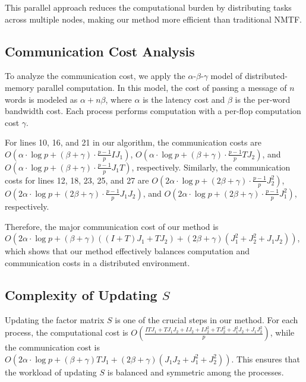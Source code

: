 \documentclass[journal]{IEEEtran}
\begin{document}
This parallel approach reduces the computational burden by distributing tasks across multiple nodes, making our method more efficient than traditional NMTF.

\subsection{Communication Cost Analysis}

To analyze the communication cost, we apply the $\alpha$-$\beta$-$\gamma$ model of distributed-memory parallel computation. In this model, the cost of passing a message of $n$ words is modeled as $\alpha + n\beta$, where $\alpha$ is the latency cost and $\beta$ is the per-word bandwidth cost. Each process performs computation with a per-flop computation cost $\gamma$.


For lines 10, 16, and 21 in our algorithm, the communication costs are $O\left(\alpha \cdot \log p + (\beta + \gamma) \cdot \frac{p-1}{p} IJ_1\right)$, $O\left(\alpha \cdot \log p + (\beta + \gamma) \cdot \frac{p-1}{p} TJ_2\right)$, and $O\left(\alpha \cdot \log p + (\beta + \gamma) \cdot \frac{p-1}{p} J_1T\right)$, respectively. Similarly, the communication costs for lines 12, 18, 23, 25, and 27 are $O\left(2\alpha \cdot \log p + (2\beta + \gamma) \cdot \frac{p-1}{p} J_2^2\right)$, $O\left(2\alpha \cdot \log p + (2\beta + \gamma) \cdot \frac{p-1}{p} J_1J_2\right)$, and $O\left(2\alpha \cdot \log p + (2\beta + \gamma) \cdot \frac{p-1}{p} J_1^2\right)$, respectively.

Therefore, the major communication cost of our method is $O\left(2\alpha \cdot \log p + (\beta + \gamma)((I + T)J_1 + TJ_2) + (2\beta + \gamma)(J_1^2 + J_2^2 + J_1J_2)\right)$, which shows that our method effectively balances computation and communication costs in a distributed environment.

\subsection{Complexity of Updating $S$}

Updating the factor matrix $S$ is one of the crucial steps in our method. For each process, the computational cost is $O\left(\frac{ITJ_1 + TJ_1J_2 + IJ_2 + IJ_2^2 + TJ_2^2 + J_1^2J_2 + J_1J_2^2}{p}\right)$, while the communication cost is $O(2\alpha \cdot \log p + (\beta + \gamma)TJ_1 + (2\beta + \gamma)(J_1J_2 + J_1^2 + J_2^2))$. This ensures that the workload of updating $S$ is balanced and symmetric among the processes.
\end{document}
